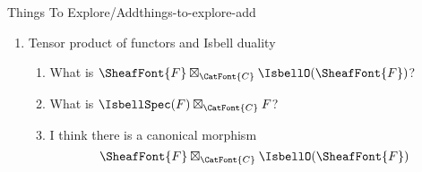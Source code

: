 \begin{remark}{Things To Explore/Add}{things-to-explore-add}
\begin{enumerate}
\begin{enumerate}
                \item Isbell duality with sheaves
                \item Isbell duality with Lawvere theories, product preserving functors or whatever
                \item Isbell duality for profunctors
                    \begin{enumerate}
                        \item In view of \cref{properties-of-the-isbell-o-functor-as-a-right-kan-lift-in-prof} of \cref{properties-of-the-isbell-o-functor}, can we just use right Kan lifts/extensions?
                        \item Right Kan lift/extension of Hom functors (there's probably a version of the Yoneda lemma here)
                            \begin{enumerate}
                                \item What is $\Rift_{F}(\Hom_{\CatFont{C}})$
                                \item What is $\Ran_{F}(\Hom_{\CatFont{C}})$
                                \item What is $\Rift_{\Hom_{\CatFont{C}}}(F)$
                                \item What is $\Ran_{\Hom_{\CatFont{C}}}(F)$
                                \item What is $\Lift_{F}(\Hom_{\CatFont{C}})$
                                \item What is $\Lan_{F}(\Hom_{\CatFont{C}})$
                                \item What is $\Lift_{\Hom_{\CatFont{C}}}(F)$
                                \item What is $\Lan_{\Hom_{\CatFont{C}}}(F)$
                            \end{enumerate}
                    \end{enumerate}
            \end{enumerate}
        \item Tensor product of functors and Isbell duality
            \begin{enumerate}
                \item What is $\SheafFont{F}\boxtimes_{\CatFont{C}}\IsbellO(\SheafFont{F})$?
                \item What is $\IsbellSpec(F)\boxtimes_{\CatFont{C}}F$?
                \item I think there is a canonical morphism
                    \[
                        \SheafFont{F}\boxtimes_{\CatFont{C}}\IsbellO(\SheafFont{F})%
\]
\end{enumerate}
\end{enumerate}
\end{remark}
